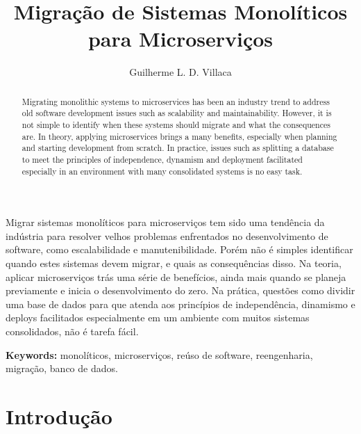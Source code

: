 \documentclass[12pt]{article}
\title{Migração de Sistemas Monolíticos para Microserviços}
\author{Guilherme L. D. Villaca\inst{1}}
\begin{document}
 

\maketitle

\begin{abstract}
Migrating monolithic systems to microservices has been an industry trend to address old software development issues such as scalability and maintainability. However, it is not simple to identify when these systems should migrate and what the consequences are. In theory, applying microservices brings a many benefits, especially when planning and starting development from scratch. In practice, issues such as splitting a database to meet the principles of independence, dynamism and deployment facilitated especially in an environment with many consolidated systems is no easy task.
\end{abstract}
     
\begin{resumo} 
Migrar sistemas monolíticos para microserviços tem sido uma tendência da indústria para resolver velhos problemas enfrentados no desenvolvimento de software, como escalabilidade e manutenibilidade. Porém não é simples identificar quando estes sistemas devem migrar, e quais as consequências disso. Na teoria, aplicar microserviços trás uma série de benefícios, ainda mais quando se planeja previamente e inicia o desenvolvimento do zero. Na prática, questões como dividir uma base de dados para que atenda aos princípios de independência, dinamismo e deploys facilitados especialmente em um ambiente com muitos sistemas consolidados, não é tarefa fácil.
\end{resumo}

{\bf Keywords:} monolíticos, microserviços, reúso de software, reengenharia, migração, banco de dados.


\section{Introdução}

\end{document}
